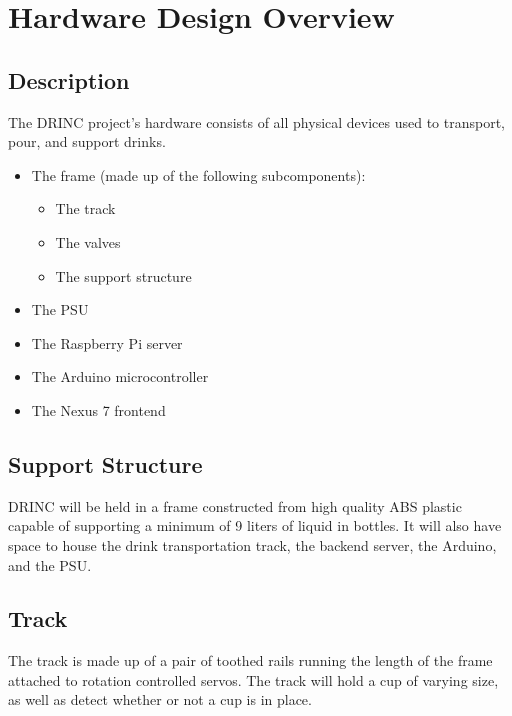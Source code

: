 \chapter{Hardware Design Overview}
{
    \renewcommand*{\theenumi}{\thesubsection.\arabic{enumi}}
    \renewcommand*{\theenumii}{\theenumi.\arabic{enumii}}
    \renewcommand*{\theenumiii}{\theenumii.\arabic{enumiii}}


    \section{Description}
        The DRINC project's hardware consists of all physical devices used 
        to transport, pour, and support drinks.
        \begin{itemize}
            \item The frame (made up of the following subcomponents):
            \begin{itemize}
                \item The track
                \item The valves
                \item The support structure
            \end{itemize}
            \item The PSU
            \item The Raspberry Pi server
            \item The Arduino microcontroller
            \item The Nexus 7 frontend
        \end{itemize}

    \section{Support Structure}
        DRINC will be held in a frame constructed from high quality ABS 
        plastic capable of supporting a minimum of 9 liters of liquid in 
        bottles.  It will also have space to house the drink transportation 
        track, the backend server, the Arduino, and the PSU.

    \section{Track}
        The track is made up of a pair of toothed rails running the length 
        of the frame attached to rotation controlled servos.  The track will 
        hold a cup of varying size, as well as detect whether or not a cup 
        is in place.

}
